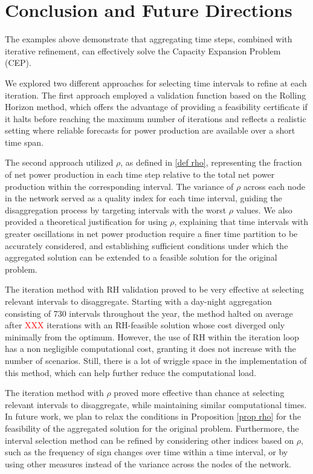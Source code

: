 \section{Conclusion and Future Directions}

The examples above demonstrate that aggregating time steps, combined with iterative refinement, can effectively solve the Capacity Expansion Problem (CEP). 

We explored two different approaches for selecting time intervals to refine at each iteration. The first approach employed a validation function based on the Rolling Horizon method, which offers the advantage of providing a feasibility certificate if it halts before reaching the maximum number of iterations and reflects a realistic setting where reliable forecasts for power production are available over a short time span.

The second approach utilized \(\rho\), as defined in \ref{def rho}, representing the fraction of net power production in each time step relative to the total net power production within the corresponding interval. 
The variance of \(\rho\) across each node in the network served as a quality index for each time interval, guiding the disaggregation process by targeting intervals with the worst \(\rho\) values. 
We also provided a theoretical justification for using \(\rho\), explaining that time intervals with greater oscillations in net power production require a finer time partition to be accurately considered, and establishing sufficient conditions under which the aggregated solution can be extended to a feasible solution for the original problem.

The iteration method with RH validation proved to be very effective at selecting relevant intervals to disaggregate. Starting with a day-night aggregation consisting of 730 intervals throughout the year, the method halted on average after \textcolor{red}{XXX} iterations with an RH-feasible solution whose cost diverged only minimally from the optimum.
However, the use of RH within the iteration loop has a non negligible computational cost, granting it does not increase with the number of scenarios. Still, there is a lot of wriggle space in the implementation of this method, which can help further reduce the computational load.

The iteration method with $\rho$ proved more effective than chance at selecting relevant intervals to disaggregate, while maintaining similar computational times.
In future work, we plan to relax the conditions in Proposition \ref{prop rho} for the feasibility of the aggregated solution for the original problem. Furthermore, the interval selection method can be refined by considering other indices based on \(\rho\), such as the frequency of sign changes over time within a time interval, or by using other measures instead of the variance across the nodes of the network.










